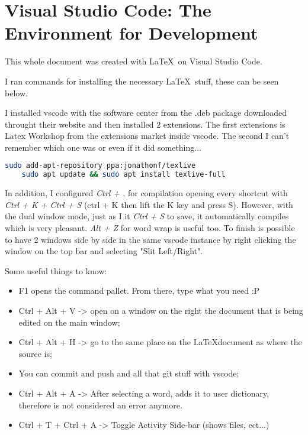 

\pagebreak
\section{Visual Studio Code: The Environment for Development}

\par This whole document was created with \LaTeX \ on Visual Studio Code. 
\par I ran commands for installing the necessary \LaTeX \ stuff, these can be seen below.
\par I installed vscode with the software center from the .deb package downloaded throught their website and then installed 2 extensions. The first extensions is Latex Workshop from the extensions market inside vscode. The second I can't remember which one was or even if it did something...

\vspace{.5cm}
\begin{lstlisting}[language=bash] 
    sudo add-apt-repository ppa:jonathonf/texlive
    sudo apt update && sudo apt install texlive-full
\end{lstlisting}
\vspace{.5cm}

\par In addition, I configured \textit{Ctrl + .} for compilation opening every shortcut with \textit{Ctrl + K + Ctrl + S} (ctrl + K then lift the K key and press S). However, with the dual window mode, just as I it \textit{Ctrl + S} to save, it automatically compiles which is very pleasant.
\textit{Alt + Z} for word wrap is useful too.
To finish is possible to have 2 windows side by side in the same vscode instance by right clicking the window on the top bar and selecting "Slit Left/Right".

\vspace{1cm}


\par Some useful things to know:
\begin{itemize}
    \item F1 opens the command pallet. From there, type what you need :P
    \item Ctrl + Alt + V -> open on a window on the right the document that is being edited on the main window;
    \item Ctrl + Alt + H -> go to the same place on the \LaTeX document as where the source is;
    \item You can commit and push and all that git stuff with vscode;
    \item Ctrl + Alt + A -> After selecting a word, adds it to user dictionary, therefore is not considered an error anymore.
    \item Ctrl + T + Ctrl + A -> Toggle Activity Side-bar (shows files, ect...)
\end{itemize}
















